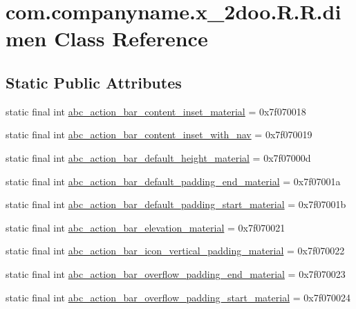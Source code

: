 \hypertarget{classcom_1_1companyname_1_1x__2doo_1_1_r_1_1dimen}{
\section{com.companyname.x\_\-2doo.R.R.dimen Class Reference}
\label{classcom_1_1companyname_1_1x__2doo_1_1_r_1_1dimen}
}
\subsection*{Static Public Attributes}
\begin{CompactItemize}
\item 
static final int \hyperlink{classcom_1_1companyname_1_1x__2doo_1_1_r_1_1dimen_26d64e6426dd7c320c887b8cb109e13b}{abc\_\-action\_\-bar\_\-content\_\-inset\_\-material} = 0x7f070018
\item 
static final int \hyperlink{classcom_1_1companyname_1_1x__2doo_1_1_r_1_1dimen_f8ab63d299065552f2bb86d79a2392e5}{abc\_\-action\_\-bar\_\-content\_\-inset\_\-with\_\-nav} = 0x7f070019
\item 
static final int \hyperlink{classcom_1_1companyname_1_1x__2doo_1_1_r_1_1dimen_82e216abf8351dc3758e9c5a3b5c28ff}{abc\_\-action\_\-bar\_\-default\_\-height\_\-material} = 0x7f07000d
\item 
static final int \hyperlink{classcom_1_1companyname_1_1x__2doo_1_1_r_1_1dimen_09a1bb4dd8a1c3617d846c1f7d58d3ea}{abc\_\-action\_\-bar\_\-default\_\-padding\_\-end\_\-material} = 0x7f07001a
\item 
static final int \hyperlink{classcom_1_1companyname_1_1x__2doo_1_1_r_1_1dimen_b8911b0eb259fd5aa73550a289f83e65}{abc\_\-action\_\-bar\_\-default\_\-padding\_\-start\_\-material} = 0x7f07001b
\item 
static final int \hyperlink{classcom_1_1companyname_1_1x__2doo_1_1_r_1_1dimen_b65c3e4826f42860514c7ddc4facc0f7}{abc\_\-action\_\-bar\_\-elevation\_\-material} = 0x7f070021
\item 
static final int \hyperlink{classcom_1_1companyname_1_1x__2doo_1_1_r_1_1dimen_b7e87eed663c5d3fef9d38bcc38afa1d}{abc\_\-action\_\-bar\_\-icon\_\-vertical\_\-padding\_\-material} = 0x7f070022
\item 
static final int \hyperlink{classcom_1_1companyname_1_1x__2doo_1_1_r_1_1dimen_8143b76f2b73889cb676fc74ada35aa5}{abc\_\-action\_\-bar\_\-overflow\_\-padding\_\-end\_\-material} = 0x7f070023
\item 
static final int \hyperlink{classcom_1_1companyname_1_1x__2doo_1_1_r_1_1dimen_07a54673ad9993dbf3de534b603f8586}{abc\_\-action\_\-bar\_\-overflow\_\-padding\_\-start\_\-material} = 0x7f070024

\end{CompactItemize}
